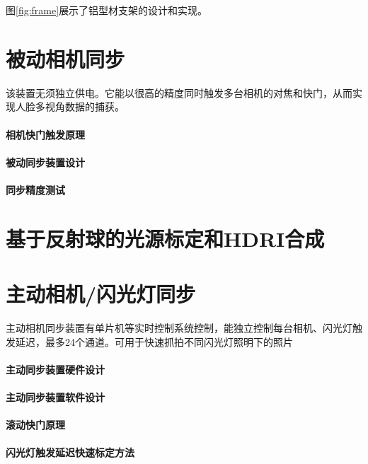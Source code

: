 图\ref{fig:frame}展示了铝型材支架的设计和实现。

\section{被动相机同步}
\label{sec:passive_sync}

该装置无须独立供电。它能以很高的精度同时触发多台相机的对焦和快门，从而实现人脸多视角数据的捕获。

\paragraph{相机快门触发原理}

\paragraph{被动同步装置设计}

\paragraph{同步精度测试}



\section{基于反射球的光源标定和HDRI合成}

\section{主动相机/闪光灯同步}

主动相机同步装置有单片机等实时控制系统控制，能独立控制每台相机、闪光灯触发延迟，最多24个通道。可用于快速抓拍不同闪光灯照明下的照片

\paragraph{主动同步装置硬件设计}

\paragraph{主动同步装置软件设计}

\paragraph{滚动快门原理}

\paragraph{闪光灯触发延迟快速标定方法}

